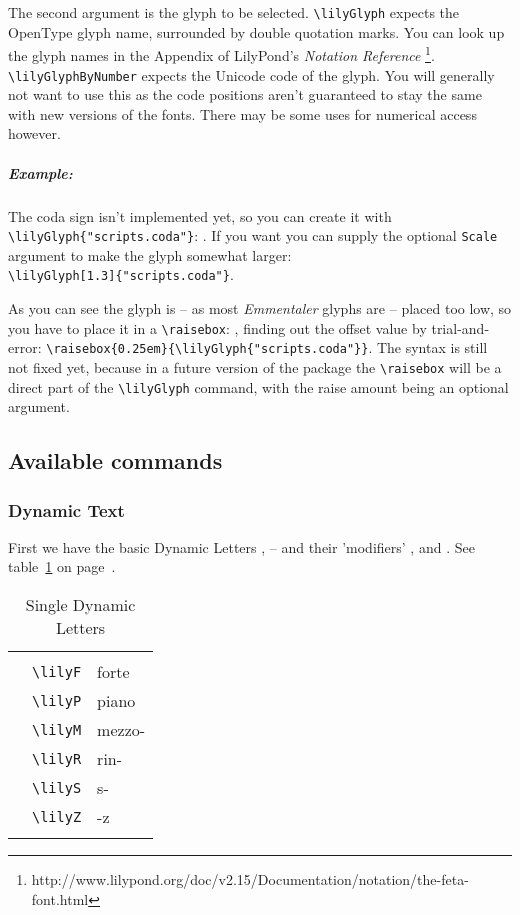 \documentclass{article}
\newcommand*{\cmd}[1]{\texttt{\textbackslash #1}}
\newcommand{\tmpCaption}{} %
\newcommand{\tmpLabel}{}
\newenvironment{reftable}[2]
	{%
		\renewcommand{\tmpCaption}{#1}
		\renewcommand{\tmpLabel}{#2}
		\begin{table}[ht]
		\begin{center}
		\begin{tabular}[t]{lll}
		\hline
		&\\
	}
	{%
		&\\
		\hline
		\end{tabular}
		\caption{\tmpCaption}
		\label{table:\tmpLabel}
		\end{center}
		\end{table}
	}
\begin{document}
The second argument is the glyph to be selected. \cmd{lilyGlyph} expects the OpenType glyph name, surrounded by double quotation marks. You can look up the glyph names in the Appendix of LilyPond's \emph{Notation Reference} \footnote{http://www.lilypond.org/doc/v2.15/Documentation/notation/the-feta-font.html}. \cmd{lilyGlyphByNumber} expects the Unicode code of the glyph. You will generally not want to use this as the code positions aren't guaranteed to stay the same with new versions of the fonts. There may be some uses for numerical access however.

\subparagraph*{Example:}
The coda sign isn't implemented yet, so you can create it with \cmd{lilyGlyph\{"scripts.coda"\}}: . If you want you can supply the optional \texttt{Scale} argument to make the glyph somewhat larger: ~\\
\cmd{lilyGlyph[1.3]\{"scripts.coda"\}}.

As you can see the glyph is -- as most \emph{Emmentaler} glyphs are -- placed too low, so you have to place it in a  \cmd{raisebox}: , finding out the offset value by trial-and-error: \cmd{raisebox\{0.25em\}\{\textbackslash lilyGlyph\{"scripts.coda"\}\}}. The syntax is still not fixed yet, because in a future version of the package the \cmd{raisebox} will be a direct part of the \cmd{lilyGlyph} command, with the raise amount being an optional argument.


\subsection{Available commands}

\subsubsection{Dynamic Text}
First we have the basic Dynamic Letters \lilyP, \lilyF* -- and their 'modifiers'
\lilyM, \lilyS* and \lilyZ. See table~\ref{table:singleDynLetters} on page~\pageref{table:singleDynLetters}.

\begin{reftable}{Single Dynamic Letters}{singleDynLetters}
\lilyF* & \cmd{lilyF} & forte\\
\lilyP* & \cmd{lilyP} & piano\\
\lilyM* & \cmd{lilyM} & mezzo-\\
\lilyR* & \cmd{lilyR} & rin-\\
\lilyS* & \cmd{lilyS} & s-\\
\lilyZ* & \cmd{lilyZ} & -z\\
\end{reftable}
\end{document}
